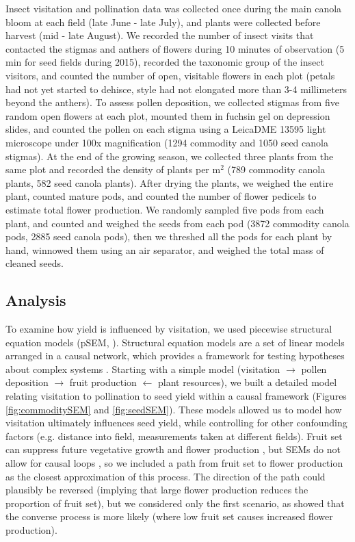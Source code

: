 \documentclass[12pt]{article} %
\begin{document}
Insect visitation and pollination data was collected once during the main canola bloom at each field (late June - late July), and plants were collected before harvest (mid - late August).
We recorded the number of insect visits that contacted the stigmas and anthers of flowers during 10 minutes of observation (5 min for seed fields during 2015), recorded the taxonomic group of the insect visitors, and counted the number of open, visitable flowers in each plot (petals had not yet started to dehisce, style had not elongated more than 3-4 millimeters beyond the anthers).
To assess pollen deposition, we collected stigmas from five random open flowers at each plot, mounted them in fuchsin gel \citep{beattie1971} on depression slides, and counted the pollen on each stigma using a Leica\texttrademark DME 13595 light microscope under 100x magnification (1294 commodity and 1050 seed canola stigmas).
At the end of the growing season, we collected three plants from the same plot and recorded the density of plants per m$^2$ (789 commodity canola plants, 582 seed canola plants).
After drying the plants, we weighed the entire plant, counted mature pods, and counted the number of flower pedicels to estimate total flower production. %
We randomly sampled five pods from each plant, and counted and weighed the seeds from each pod (3872 commodity canola pods, 2885 seed canola pods), then we threshed all the pods for each plant by hand, winnowed them using an air separator, and weighed the total mass of cleaned seeds.

\subsection{Analysis}
To examine how yield is influenced by visitation, we used piecewise structural equation models (pSEM, \citealp{shipley2009}).
Structural equation models are a set of linear models arranged in a causal network, which provides a framework for testing hypotheses about complex systems \citep{grace2012, lefcheck2015}.
Starting with a simple model (visitation $\rightarrow$ pollen deposition $\rightarrow$ fruit production $\leftarrow$ plant resources), we built a detailed model relating visitation to pollination to seed yield within a causal framework (Figures \ref{fig:commoditySEM} and \ref{fig:seedSEM}).
These models allowed us to model how visitation ultimately influences seed yield, while controlling for other confounding factors (e.g. distance into field, measurements taken at different fields).
Fruit set can suppress future vegetative growth and flower production \citep{stephenson1981}, but SEMs do not allow for causal loops \citep{grace2012}, so we included a path from fruit set to flower production as the closest approximation of this process.
The direction of the path could plausibly be reversed (implying that large flower production reduces the proportion of fruit set), but we considered only the first scenario, as \citet{sabbahi2006} showed that the converse process is more likely (where low fruit set causes increased flower production).
\end{document}
